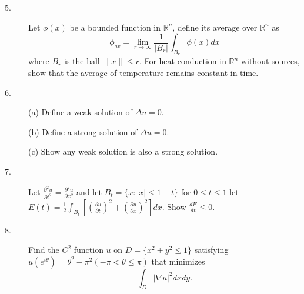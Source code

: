 \documentclass{article}
\def\R{\mathbb R}
\begin{document}
\begin{description}
\item[5.]
Let $\phi(x)$ be a bounded function in $\R^n$, define its average over
$\R^n$ as
$$\phi_{av} = \lim_{r \to \infty} \frac{1}{|B_r|} \int_{B_r}
  \phi (x) dx$$
where $B_r$ is the ball $\parallel x \parallel \leq r$. For heat conduction
in $\R^n$ without sources, show that the average of temperature remains
constant in time.

\item[6.] (a)
Define a weak solution of $\Delta u=0$.

\item[\quad] (b)
Define a strong solution of $\Delta u=0$.

\item[\quad] (c)
Show any weak solution is also a strong solution.

\item[7.]
Let $\frac{\partial^2 u}{\partial t^2} = \frac{\partial^2u}{\partial x^2}$
and let $B_t = \{x: |x| \leq 1-t\}$ for $0 \leq t \leq 1$ let
$E(t) = \frac{1}{2} \int_{B_t}
\left[\left(\frac{\partial u}{\partial t}\right)^2 +
\left(\frac{\partial u}{\partial x}\right)^2\right] dx$.
Show $\frac{dE}{dt} \leq 0$.

\item[8.]
Find the $C^2$ function $u$ on $D=\{x^2+y^2 \leq 1\}$
satisfying $u(e^{i\theta}) = \theta^2 - \pi^2 (-\pi < \theta \leq \pi)$
that minimizes
$$\int_D |\nabla u|^2 dxdy.$$






\end{description}    
\end{document}
